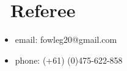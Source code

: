 \documentclass{resume}
\begin{document}
\section{\faFax\ Referee}
\begin{itemize}[parsep=0.5ex]
  \item email: fowleg20@gmail.com
  \item phone: (+61) (0)475-622-858
\end{itemize}
%
%
\end{document}
